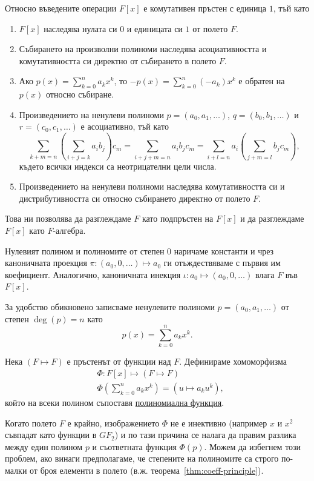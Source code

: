\documentclass[numbers=endperiod, DIV=15, bibliography=totocnumbered]{scrartcl}
\begin{document}
Относно въведените операции $F[x]$ е комутативен пръстен с единица $1$, тъй като
\begin{enumerate}
  \item $F[x]$ наследява нулата си $0$ и единицата си $1$ от полето $F$.
  \item Събирането на произволни полиноми наследява асоциативността и комутативността си директно от събирането в полето $F$.
  \item Ако $p(x) = \sum_{k=0}^n a_k x^k$, то $-p(x) = \sum_{k=0}^n (-a_k) x^k$ е обратен на $p(x)$ относно събиране.
  \item Произведението на ненулеви полиноми $p = (a_0, a_1, \ldots)$, $q = (b_0, b_1, \ldots)$ и $r = (c_0, c_1, \ldots)$ е асоциативно, тъй като
  \begin{displaymath}
    \sum_{k+m=n} \left(\sum_{i+j=k} a_i b_j \right) c_m
    =
    \sum_{i+j+m=n} a_i b_j c_m
    =
    \sum_{i+l=n} a_i \left( \sum_{j+m=l} b_j c_m \right),
  \end{displaymath}
  където всички индекси са неотрицателни цели числа.
  \item Произведението на ненулеви полиноми наследява комутативността си и дистрибутивността си относно събирането директно от полето $F$.
\end{enumerate}

Това ни позволява да разглеждаме $F$ като подпръстен на $F[x]$ и да разглеждаме $F[x]$ като $F$-алгебра.

Нулевият полином и полиномите от степен $0$ наричаме константи и чрез каноничната проекция $\pi: (a_0, 0, \ldots) \mapsto a_0$ ги отъждествяваме с първия им коефициент. Аналогично, каноничната инекция $\iota: a_0 \mapsto (a_0, 0, \ldots)$ влага $F$ във $F[x]$.

За удобство обикновено записваме ненулевите полиноми $p = (a_0, a_1, \ldots)$ от степен $\deg(p) = n$ като
\begin{displaymath}
  p(x) = \sum_{k=0}^n a_k x^k.
\end{displaymath}

Нека $(F \mapsto F)$ е пръстенът от функции над $F$. Дефинираме хомоморфизма
\begin{align*}
  &\Phi: F[x] \mapsto (F \mapsto F) \\
  &\Phi\left( \sum_{k=0}^n a_k x^k \right) = \left( u \mapsto a_k u^k \right),
\end{align*}
който на всеки полином съпоставя \uline{полиномиална функция}.

Когато полето $F$ е крайно, изображението $\Phi$ не е инективно (например $x$ и $x^2$ съвпадат като функции в $GF_2$) и по тази причина се налага да правим разлика между един полином $p$ и съответната функция $\Phi(p)$. Можем да избегнем този проблем, ако винаги предполагаме, че степените на полиномите са строго по-малки от броя елементи в полето (в.ж. теорема~\ref{thm:coeff-principle}).
\end{document}
